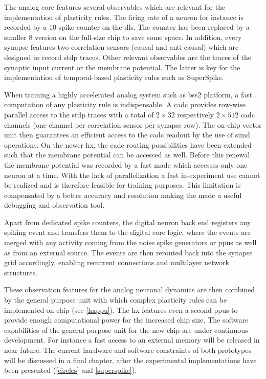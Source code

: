 The analog core features several observables which are relevant for the implementation of plasticity rules. The firing rate of a neuron for instance is recorded by a \SI{10}{\bit} spike counter on the \gls{dls}. The counter has been replaced by a smaller \SI{8}{\bit} version on the full-size chip to save some space. In addition, every synapse features two correlation sensors (causal and anti-causal) which are designed to record \gls{stdp} traces. Other relevant observables are the traces of the synaptic input current or the membrane potential. The latter is key for the implementation of temporal-based plasticity rules such as SuperSpike.

When training a highly accelerated analog system such as \gls{bss2} platform, a fast computation of any plasticity rule is indispensable. A \gls{cadc} provides row-wise parallel access to the \gls{stdp} traces with a total of $2 \times 32$ respectively $2 \times 512$ \gls{cadc} channels (one channel per correlation sensor per synapse row). The on-chip vector unit then guarantees an efficient access to the \gls{cadc} readout by the use of \gls{simd} operations. On the newer \gls{hx}, the \gls{cadc} routing possibilities have been extended such that the membrane potential can be accessed as well. Before this renewal the membrane potential was recorded by a fast \gls{madc} which accesses only one neuron at a time. With the lack of parallelization a fast in-experiment use cannot be realized and is therefore feasible for training purposes. This limitation is compensated by a better accuracy and resolution making the \gls{madc} a useful debugging and observation tool.

Apart from dedicated spike counters, the digital neuron back end registers any spiking event and transfers them to the digital core logic, where the events are merged with any activity coming from the noise spike generators or \glspl{ppu} as well as from an external source. The events are then rerouted back into the synapse grid accordingly, enabling recurrent connections and multilayer network structures.

These observation features for the analog neuronal dynamics are then combined by the general purpose unit with which complex plasticity rules can be implemented on-chip (see \cref{hxppu}). The \gls{hx} features even a second \glspl{ppu} to provide enough computational power for the increased chip size. The software capabilities of the general purpose unit for the new chip are under continuous development. For instance a fast access to an external memory will be released in near future. The current hardware and software constraints of both prototypes will be discussed in a final chapter, after the experimental implementations have been presented (\cref{circles} and \cref{superspike}).

